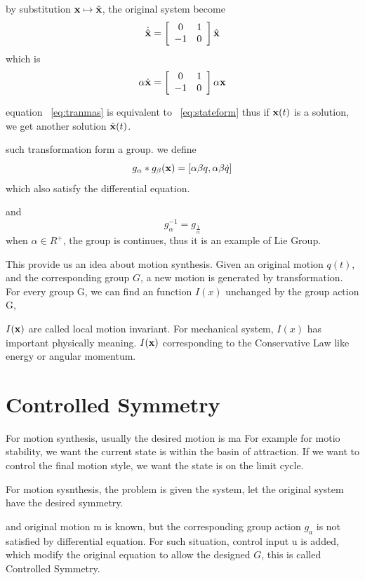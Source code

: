 by substitution $\mathbf{x} \mapsto \hat{\mathbf{x}}$, the original system become
\[ 
\dot{\hat{\mathbf{x}}}=
\left[ 
\begin{array}{cc}
0 &1\\
-1 &0 
\end{array}
\right]\hat{\mathbf{x}}
\]
which is 
\begin{equation}
\label{eq:tranmas} 
\alpha \dot{\mathbf{x}}=
\left[ 
\begin{array}{cc}
0 &1\\
-1 &0 
\end{array}
\right]\alpha \mathbf{x}
\end{equation}

equation ~\ref{eq:tranmas} is equivalent to  ~\ref{eq:stateform}
thus if $\mathbf{x}(t)$ is a solution, we get another solution $\hat{\mathbf{x}}(t)$.

such transformation form a group.
we define 
\[
g_{\alpha}*g_{\beta}(\mathbf{x})=[\alpha \beta q, \alpha \beta \dot{q}]
\]
which also satisfy the differential equation.

and 
\[
g_{\alpha}^{-1}=g_{\frac{1}{\alpha}}
\]
when $\alpha \in R^+$, the group is continues,
thus it is an example of Lie Group.





This provide us an idea about motion synthesis.
Given an original motion $q(t)$, and the corresponding group $G$, a new motion is generated by transformation.
For every group G, we can find an function $I(x)$ unchanged by the group action G, 

$I(\mathbf{x})$ are called local motion invariant. 
For mechanical system,  $I(x)$ has important physically meaning. 
$I(\mathbf{x})$ corresponding to the Conservative Law like energy or angular momentum.


\section{Controlled Symmetry}
For motion synthesis, usually the desired motion is ma
For example for motio stability, we want the current state is within the basin of attraction.
If we want to control the final motion style, we want the state is on the limit cycle.

For motion sysnthesis, the problem is given the system, let the original system have the desired symmetry.

 and original motion m is  known, but the corresponding group action $g_a$ is not satisfied by differential equation.
For such situation, control input u  is added, which modify the original equation to allow the designed $G$, this is called Controlled Symmetry.

